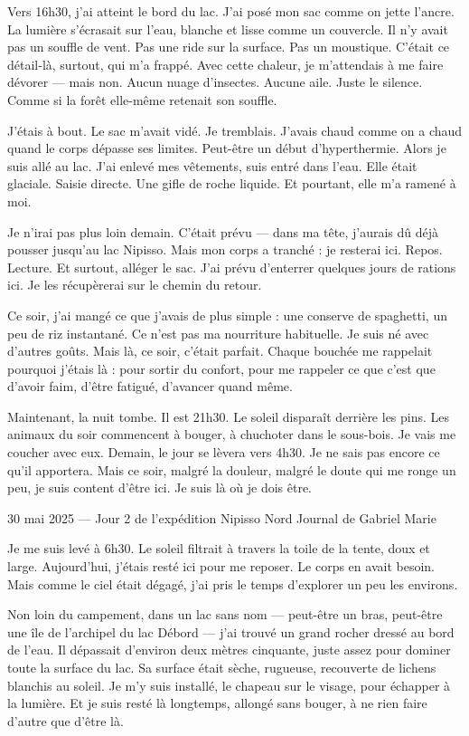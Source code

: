 Vers 16h30, j’ai atteint le bord du lac. J’ai posé mon sac comme on jette l’ancre. La lumière s’écrasait sur l’eau, blanche et lisse comme un couvercle. Il n’y avait pas un souffle de vent. Pas une ride sur la surface. Pas un moustique. C’était ce détail-là, surtout, qui m’a frappé. Avec cette chaleur, je m’attendais à me faire dévorer — mais non. Aucun nuage d’insectes. Aucune aile. Juste le silence. Comme si la forêt elle-même retenait son souffle.

J’étais à bout. Le sac m’avait vidé. Je tremblais. J’avais chaud comme on a chaud quand le corps dépasse ses limites. Peut-être un début d’hyperthermie. Alors je suis allé au lac. J’ai enlevé mes vêtements, suis entré dans l’eau. Elle était glaciale. Saisie directe. Une gifle de roche liquide. Et pourtant, elle m’a ramené à moi.

Je n’irai pas plus loin demain. C’était prévu — dans ma tête, j’aurais dû déjà pousser jusqu’au lac Nipisso. Mais mon corps a tranché : je resterai ici. Repos. Lecture. Et surtout, alléger le sac. J’ai prévu d’enterrer quelques jours de rations ici. Je les récupèrerai sur le chemin du retour.

Ce soir, j’ai mangé ce que j’avais de plus simple : une conserve de spaghetti, un peu de riz instantané. Ce n’est pas ma nourriture habituelle. Je suis né avec d’autres goûts. Mais là, ce soir, c’était parfait. Chaque bouchée me rappelait pourquoi j’étais là : pour sortir du confort, pour me rappeler ce que c’est que d’avoir faim, d’être fatigué, d’avancer quand même.

Maintenant, la nuit tombe. Il est 21h30. Le soleil disparaît derrière les pins. Les animaux du soir commencent à bouger, à chuchoter dans le sous-bois. Je vais me coucher avec eux. Demain, le jour se lèvera vers 4h30. Je ne sais pas encore ce qu’il apportera. Mais ce soir, malgré la douleur, malgré le doute qui me ronge un peu, je suis content d’être ici. Je suis là où je dois être.



30 mai 2025 — Jour 2 de l’expédition Nipisso Nord
Journal de Gabriel Marie

Je me suis levé à 6h30. Le soleil filtrait à travers la toile de la tente, doux et large. Aujourd’hui, j’étais resté ici pour me reposer. Le corps en avait besoin. Mais comme le ciel était dégagé, j’ai pris le temps d’explorer un peu les environs.

Non loin du campement, dans un lac sans nom — peut-être un bras, peut-être une île de l’archipel du lac Débord — j’ai trouvé un grand rocher dressé au bord de l’eau. Il dépassait d’environ deux mètres cinquante, juste assez pour dominer toute la surface du lac. Sa surface était sèche, rugueuse, recouverte de lichens blanchis au soleil. Je m’y suis installé, le chapeau sur le visage, pour échapper à la lumière. Et je suis resté là longtemps, allongé sans bouger, à ne rien faire d’autre que d’être là.

